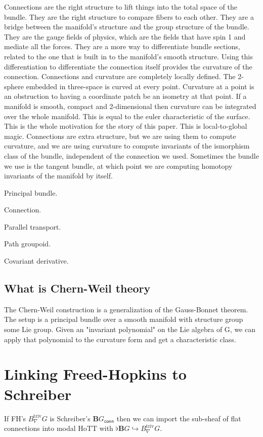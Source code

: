 \documentclass[12pt]{article}
\newcommand{\bg}{\ensuremath{\textbf{B}G}}
\newcommand{\bgconn}{\ensuremath{\textbf{B}G_{\textsf{conn}}}}
\begin{document}
Connections are the right structure to lift things into the total space of the bundle. They are the right structure to compare fibers to each other. They are a bridge between the manifold's structure and the group structure of the bundle. They are the gauge fields of physics, which are the fields that have spin 1 and mediate all the forces. They are a more way to differentiate bundle sections, related to the one that is built in to the manifold's smooth structure. Using this differentiation to differentiate the connection itself provides the curvature of the connection. Connections and curvature are completely locally defined. The 2-sphere embedded in three-space is curved at every point. Curvature at a point is an obstruction to having a coordinate patch be an isometry at that point. If a manifold is smooth, compact and 2-dimensional then curvature can be integrated over the whole manifold. This is equal to the euler characteristic of the surface. This is the whole motivation for the story of this paper. This is local-to-global magic. Connections are extra structure, but we are using them to compute curvature, and we are using curvature to compute invariants of the ismorphism class of the bundle, independent of the connection we used. Sometimes the bundle we use is the tangent bundle, at which point we are computing homotopy invariants of the manifold by itself.

Principal bundle.

Connection.

Parallel transport.

Path groupoid.

Covariant derivative.




\subsection{What is Chern-Weil theory}
The Chern-Weil construction is a generalization of the Gauss-Bonnet theorem. The setup is a principal bundle over a smooth manifold with structure group some Lie group. Given an "invariant polynomial" on the Lie algebra of G, we can apply that polynomial to the curvature form and get a characteristic class.

\section{Linking Freed-Hopkins to Schreiber}
If FH's $B_{\nabla}^{\mathrm{triv}}G$ is Schreiber's $\bgconn$ then we can import the sub-sheaf of flat connections into modal HoTT with $\flat\bg\hookrightarrow B_{\nabla}^{\mathrm{triv}}G$.
\end{document}
